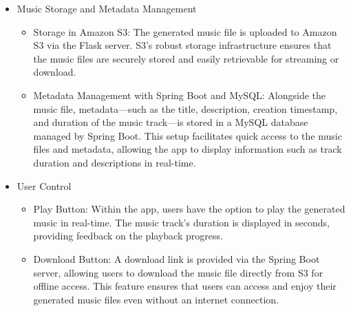 \documentclass[conference]{IEEEtran}
\begin{document}
\begin{itemize}
    \item Music Storage and Metadata Management
\begin{itemize}
    \item Storage in Amazon S3: The generated music file is uploaded to Amazon S3 via the Flask server. S3’s robust storage infrastructure ensures that the music files are securely stored and easily retrievable for streaming or download.\\
    \item Metadata Management with Spring Boot and MySQL: Alongside the music file, metadata—such as the title, description, creation timestamp, and duration of the music track—is stored in a MySQL database managed by Spring Boot. This setup facilitates quick access to the music files and metadata, allowing the app to display information such as track duration and descriptions in real-time.\\
\end{itemize}
\item User Control
\begin{itemize}
    \item Play Button: Within the app, users have the option to play the generated music in real-time. The music track’s duration is displayed in seconds, providing feedback on the playback progress.\\
    \item Download Button: A download link is provided via the Spring Boot server, allowing users to download the music file directly from S3 for offline access. This feature ensures that users can access and enjoy their generated music files even without an internet connection.\\
\end{itemize}
\end{itemize}
\end{document}

